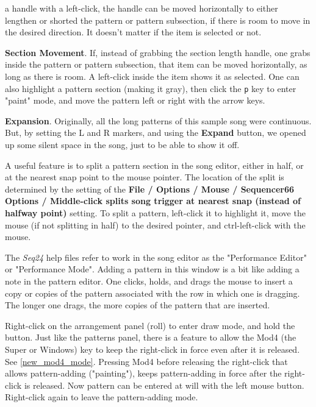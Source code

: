 \begin{enumber}
         a handle with a left-click, the handle can be moved horizontally
         to either lengthen or shorted the pattern or pattern subsection, if
         there is room to move in the desired direction.
         It doesn't matter if the item is selected or not.
      \item \textbf{Section Movement}.
         If, instead of grabbing the section length handle, one grabs inside
         the pattern or pattern subsection, that item can be moved
         horizontally, as long as there is room.  A left-click
         inside the item shows it as selected.
         One can also highlight a pattern section (making it gray),
         then click the \texttt{p} key to enter "paint" mode, and move the
         pattern left or right with the arrow keys.
      \item \textbf{Expansion}.
         Originally, all the long patterns of this sample song were continuous.
         But, by setting the L and R markers, and using the \textbf{Expand}
         button, we opened up some silent space in the song, just to be able
         to show it off.
   \end{enumber}

   A useful feature is to split a pattern section in the
   song editor, either in half, or at the nearest snap point to the mouse
   pointer.
   The location of the split is determined by the
   setting of the \textbf{File / Options / Mouse / Sequencer66 Options /
   Middle-click splits song trigger at nearest snap (instead of halfway point)}
   setting.  To split a pattern, left-click it to highlight it, move
   the mouse (if not splitting in half) to the desired pointer, and
   ctrl-left-click with the mouse.

   The \textsl{Seq24} help files refer to work in the song editor as the
   "Performance Editor" or "Performance Mode".  Adding a pattern in this
   window is a bit like adding a note in the pattern editor.
   One clicks, holds, and drags the mouse to insert a copy or copies of the
   pattern associated with the row in which one is dragging.
   The longer one drags, the more copies of the pattern that are inserted.

	Right-click on the arrangement panel (roll) to enter
   draw mode, and hold the button.
   Just like the patterns panel, there is a feature to allow the Mod4 (the
   Super or Windows) key to keep the right-click in force even after it is
   released.  See \ref{new_mod4_mode}.  Pressing Mod4 before
   releasing the right-click that allows pattern-adding ("painting"), keeps
   pattern-adding in force after the right-click is released.  Now pattern
   can be entered at will with the left mouse button.  Right-click again to
   leave the pattern-adding mode.

